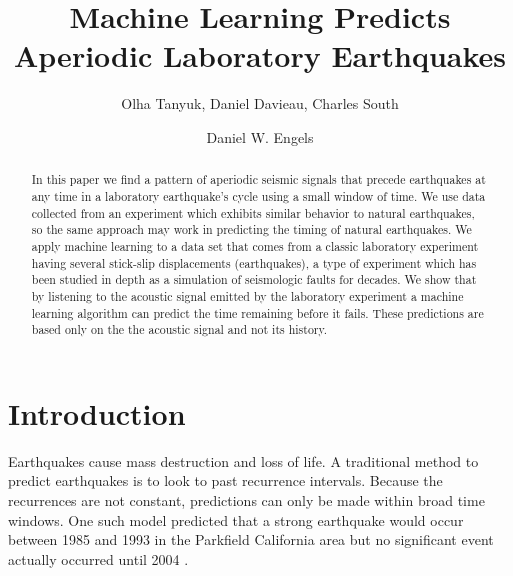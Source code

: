 \documentclass[]{llncs} %
\begin{document}

\title{Machine Learning Predicts Aperiodic Laboratory Earthquakes}
\author{Olha Tanyuk, Daniel Davieau, Charles South \and Daniel W. Engels}


\maketitle
\begin{abstract}
 In this paper we find a pattern of aperiodic seismic signals that precede earthquakes at any time in a laboratory earthquake’s cycle using a small window of time.  We use data collected from an experiment which exhibits similar behavior to natural earthquakes, so the same approach may work in predicting the timing of natural earthquakes. We apply machine learning to a data set that comes from a classic laboratory experiment having several stick-slip displacements (earthquakes), a type of experiment which has been studied in depth as a simulation of seismologic faults for decades. We show that by listening to the acoustic signal emitted by the laboratory experiment a machine learning algorithm can predict the time remaining before it fails. These predictions are based only on the the acoustic signal and not its history. \par
	
\end{abstract}

\section{Introduction}
Earthquakes cause mass destruction and loss of life. A traditional method to predict earthquakes is to look to past recurrence intervals. Because the recurrences are not constant, predictions can only be made within broad time windows. One such model predicted that a strong earthquake would occur between 1985 and 1993 in the Parkfield California area but no significant event actually occurred until 2004 \cite{Jackson}. \par
\end{document}
